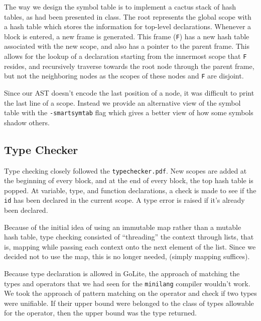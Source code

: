 \documentclass{article}
\begin{document}
The way we design the symbol table is to implement a cactus stack of hash tables, as had been presented in class. The root represents the global scope with a hash table which stores the information for top-level declarations. Whenever a block is entered, a new frame is generated. This frame (\verb|F|) has a new hash table associated with the new scope, and also has a pointer to the parent frame. This allows for the lookup of a declaration starting from the innermost scope that \verb|F| resides, and recursively traverse towards the root node through the parent frame, but not the neighboring nodes as the scopes of these nodes and \verb|F| are disjoint.


Since our AST doesn't encode the last position of a node, it was difficult to print the last line of a scope. Instead we provide an alternative view of the symbol table with the \verb|-smartsymtab| flag which gives a better view of how some symbols shadow others.

\subsection{Type Checker}
Type checking closely followed the \verb|typechecker.pdf|. New scopes are added at the beginning of every block, and at the end of every block, the top hash table is popped. At variable, type, and function declarations, a check is made to see if the \verb|id| has been declared in the current scope. A type error is raised if it's already been declared.

Because of the initial idea of using an immutable map rather than a mutable hash table, type checking consisted of ``threading'' the context through lists, that is, mapping while passing each context onto the next element of the list. Since we decided not to use the map, this is no longer needed, (simply mapping suffices).

Because type declaration is allowed in GoLite, the approach of matching the types and operators that we had seen for the \verb|minilang| compiler wouldn't work. We took the approach of pattern matching on the operator and check if two types were unifiable. If their upper bound were belonged to the class of types allowable for the operator, then the upper bound was the type returned.
\end{document}
